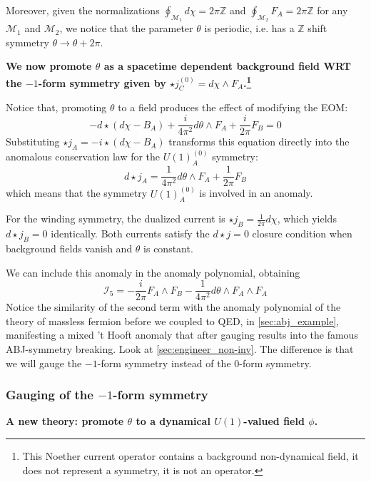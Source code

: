 \documentclass[aps,preprint,nofootinbib,preprintnumbers,eqsecnum,superscriptaddress]{revtex4}
\numberwithin{equation}{section}
\begin{document}
Moreover, given the normalizations $\oint_{\mathcal{M}_1}d\chi=2\pi \mathbb{Z}$ and $\oint_{\mathcal{M}_2} F_A =2\pi \mathbb{Z}$ for any $\mathcal{M}_1$ and $\mathcal{M}_2$, we notice that the parameter $\theta$ is periodic, i.e. has a $\mathbb{Z}$ shift symmetry $\theta \to \theta + 2\pi$. 

{\bf We now promote $\theta$ as a spacetime dependent background field WRT the $-1$-form symmetry given by $\star j^{(0)}_C = d\chi \wedge F_A$.\footnote{This Noether current operator contains a background non-dynamical field, it does not represent a symmetry, it is not an operator.}} 

Notice that, promoting $\theta$ to a field produces the effect of modifying the EOM:
\begin{equation}
-d\star(d\chi - B_A) + \frac{i}{4\pi^2}d\theta\wedge F_A + \frac{i}{2\pi}F_B = 0
\end{equation}
Substituting $\star j_A = -i \star(d\chi - B_A)$ transforms this equation directly into the anomalous conservation law for the $U(1)^{(0)}_A$ symmetry:
\begin{equation}
d\star j_A = \frac{1}{4\pi^2}d\theta \wedge F_A + \frac{1}{2\pi}F_B
\end{equation}
which means that the symmetry $U(1)^{(0)}_A$ is involved in an anomaly.

For the winding symmetry, the dualized current is $\star j_B = \frac{1}{2\pi}d\chi$, which yields $d\star j_B = 0$ identically. Both currents satisfy the $d\star j = 0$ closure condition when background fields vanish and $\theta$ is constant.


We can include this anomaly in the anomaly polynomial, obtaining 
\begin{equation}
\mathcal{I}_5 = -\frac{i}{2\pi} F_A \wedge F_B - \frac{1}{4 \pi^2} d\theta \wedge F_A \wedge F_A
\end{equation}
Notice the similarity of the second term with the anomaly polynomial of the theory of massless fermion before we coupled to QED, in \ref{sec:abj_example}, manifesting a mixed 't Hooft anomaly that after gauging results into the famous ABJ-symmetry breaking. Look at \ref{sec:engineer_non-inv}. The difference is that we will gauge the $-1$-form symmetry instead of the $0$-form symmetry.

\subsubsection{Gauging of the $-1$-form symmetry}
\label{sec:superfluid_00_composite}
{\bf A new theory: promote $\theta$ to a dynamical $U(1)$-valued field $\phi$.} 
\end{document}

